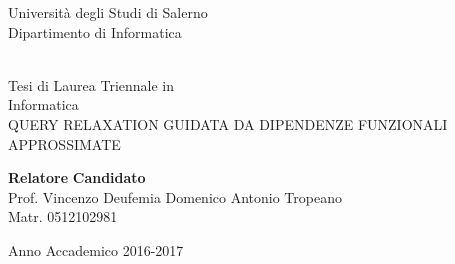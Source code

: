 \begin{center}
{\Large Università degli Studi di Salerno}\\[0.2truecm]
{\large Dipartimento di Informatica}\\
\hrulefill
\vfill
{}\\[0.2truecm]
\vfill

{\large Tesi di Laurea Triennale in }\\[0.2truecm]
{\Large Informatica}\\
\vfill\vfill
{\large QUERY RELAXATION GUIDATA DA DIPENDENZE FUNZIONALI APPROSSIMATE}
\vfill\vfill


 {\bf Relatore} \hfill {\bf Candidato}\ \ \\
Prof. Vincenzo Deufemia \hfill Domenico Antonio Tropeano \\
\hfill Matr. 0512102981
\vfill
\hrulefill 

Anno Accademico 2016-2017

\end{center}
